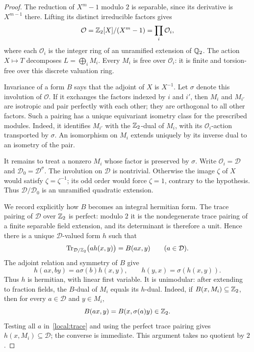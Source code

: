 \begin{proof}
The reduction of $X^m-1$ modulo $2$ is separable, since its derivative
is $X^{m-1}$ there.  Lifting its distinct irreducible factors gives
\[
 \mathcal O=\mathbb Z_2[X]/(X^m-1)=\prod_i\mathcal O_i,
\]
where each $\mathcal O_i$ is the integer ring of an unramified
extension of $\mathbb Q_2$.  The action $X\mapsto T$ decomposes
$L=\bigoplus_i M_i$.  Every $M_i$ is free over $\mathcal O_i$:
it is finite and torsion-free over this discrete valuation ring.

Invariance of a form $B$ says that the adjoint of $X$ is $X^{-1}$.
Let $\sigma$ denote this involution of $\mathcal O$.  If it exchanges
the factors indexed by $i$ and $i'$, then $M_i$ and $M_{i'}$ are
isotropic and pair perfectly with each other; they are orthogonal to
all other factors.  Such a pairing has a unique equivariant isometry
class for the prescribed modules.  Indeed, it identifies $M_{i'}$
with the $\mathbb Z_2$-dual of $M_i$, with its $\mathcal O_i$-action
transported by $\sigma$.  An isomorphism on $M_i$ extends uniquely by
its inverse dual to an isometry of the pair.

It remains to treat a nonzero $M_i$ whose factor is preserved by
$\sigma$.  Write $\mathcal O_i=\mathcal D$ and
$\mathcal D_0=\mathcal D^\sigma$.
The involution on $\mathcal D$ is nontrivial.  Otherwise the image
$\zeta$ of $X$ would satisfy $\zeta=\zeta^{-1}$; its odd order would
force $\zeta=1$, contrary to the hypothesis.  Thus
$\mathcal D/\mathcal D_0$ is an unramified quadratic extension.

We record explicitly how $B$ becomes an integral hermitian form.
The trace pairing of $\mathcal D$ over $\mathbb Z_2$ is perfect: modulo
$2$ it is the nondegenerate trace pairing of a finite separable field
extension, and its determinant is therefore a unit.  Hence there is
a unique $\mathcal D$-valued form $h$ such that
\begin{equation}\label{local:trace}
 \operatorname{Tr}_{\mathcal D/\mathbb Z_2}\bigl(a h(x,y)\bigr)
       =B(ax,y)\qquad(a\in\mathcal D).
\end{equation}
The adjoint relation and symmetry of $B$ give
\[
 h(ax,by)=a\sigma(b)h(x,y),\qquad
 h(y,x)=\sigma(h(x,y)).
\]
Thus $h$ is hermitian, with linear first variable.
It is unimodular: after extending to fraction fields, the $B$-dual
of $M_i$ equals its $h$-dual.  Indeed, if $B(x,M_i)\subseteq\mathbb Z_2$,
then for every $a\in\mathcal D$ and $y\in M_i$,
\[
 B(ax,y)=B(x,\sigma(a)y)\in\mathbb Z_2.
\]
Testing all $a$ in~\eqref{local:trace} and using the perfect trace
pairing gives $h(x,M_i)\subseteq\mathcal D$; the converse is immediate.
This argument takes no quotient by $2$.


\end{proof}

